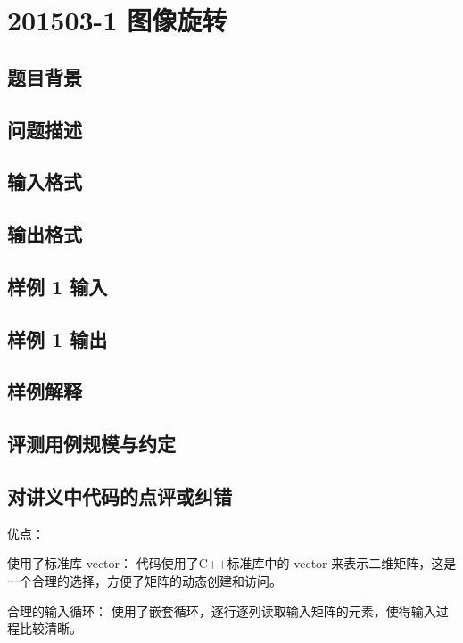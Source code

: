 \section{201503-1 图像旋转}

\subsection{题目背景}

\subsection{问题描述}

\subsection{输入格式}

\subsection{输出格式}

\subsection{样例 1 输入}

\subsection{样例 1 输出}

\subsection{样例解释}

\subsection{评测用例规模与约定}

\subsection{对讲义中代码的点评或纠错}
 
优点：

使用了标准库 vector： 代码使用了C++标准库中的 vector 来表示二维矩阵，这是一个合理的选择，方便了矩阵的动态创建和访问。

合理的输入循环： 使用了嵌套循环，逐行逐列读取输入矩阵的元素，使得输入过程比较清晰。

